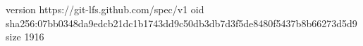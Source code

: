 version https://git-lfs.github.com/spec/v1
oid sha256:07bb0348da9edcb21dc1b1743dd9c50db3db7d3f5de8480f5437b8b66273d5d9
size 1916
